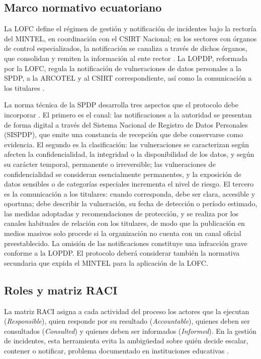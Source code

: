 \subsection{Marco normativo ecuatoriano}
La LOFC define el régimen de gestión y notificación de incidentes bajo la rectoría del MINTEL, en coordinación con el CSIRT Nacional; en los sectores con órganos de control especializados, la notificación se canaliza a través de dichos órganos, que consolidan y remiten la información al ente rector \cite{lofc2026}. La LOPDP, reformada por la LOFC, regula la notificación de vulneraciones de datos personales a la SPDP, a la ARCOTEL y al CSIRT correspondiente, así como la comunicación a los titulares \cite{lopdp2021,lofc2026}.

La norma técnica de la SPDP desarrolla tres aspectos que el protocolo debe incorporar \cite{spdp2026norma}. El primero es el canal: las notificaciones a la autoridad se presentan de forma digital a través del Sistema Nacional de Registro de Datos Personales (SISPDP), que emite una constancia de recepción que debe conservarse como evidencia. El segundo es la clasificación: las vulneraciones se caracterizan según afecten la confidencialidad, la integridad o la disponibilidad de los datos, y según su carácter temporal, permanente o irreversible; las vulneraciones de confidencialidad se consideran esencialmente permanentes, y la exposición de datos sensibles o de categorías especiales incrementa el nivel de riesgo. El tercero es la comunicación a los titulares: cuando corresponda, debe ser clara, accesible y oportuna; debe describir la vulneración, su fecha de detección o período estimado, las medidas adoptadas y recomendaciones de protección, y se realiza por los canales habituales de relación con los titulares, de modo que la publicación en medios masivos solo procede si la organización no cuenta con un canal oficial preestablecido. La omisión de las notificaciones constituye una infracción grave conforme a la LOPDP. El protocolo deberá considerar también la normativa secundaria que expida el MINTEL para la aplicación de la LOFC.

\subsection{Roles y matriz RACI}
La matriz RACI asigna a cada actividad del proceso los actores que la ejecutan (\textit{Responsible}), quien responde por su resultado (\textit{Accountable}), quienes deben ser consultados (\textit{Consulted}) y quienes deben ser informados (\textit{Informed}). En la gestión de incidentes, esta herramienta evita la ambigüedad sobre quién decide escalar, contener o notificar, problema documentado en instituciones educativas \cite{ojala2025cybersecurity}.

